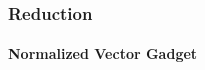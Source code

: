 \begin{frame}
	\frametitle{Reduction}
	\framesubtitle{Normalized Vector Gadget}

	\begin{figure}
	\centering
	
	\end{figure}
%	
%		
\end{frame}